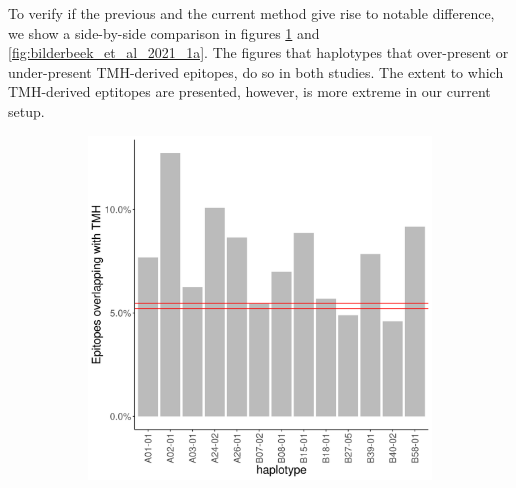 
To verify if the previous and the current method give rise to
notable difference, we show a side-by-side comparison
in figures \ref{fig:bianch_et_al_2017_1a} and \ref{fig:bilderbeek_et_al_2021_1a}.
The figures that haplotypes that over-present or under-present TMH-derived epitopes,
do so in both studies. The extent to which TMH-derived eptitopes are
presented, however, is more extreme in our current setup.

\begin{figure}
  \centering
  \begin{subfigure}[t]{0.45\textwidth}
    \centering
    \caption{}
    \includegraphics[width=\linewidth]{bianchi_et_al_2017_results/fig_1a.png}
    \label{fig:bianch_et_al_2017_1a}
  \end{subfigure}
  \hfill
  \begin{subfigure}[t]{0.45\textwidth}
    \centering
    \caption{}

\end{subfigure}
\end{figure}
